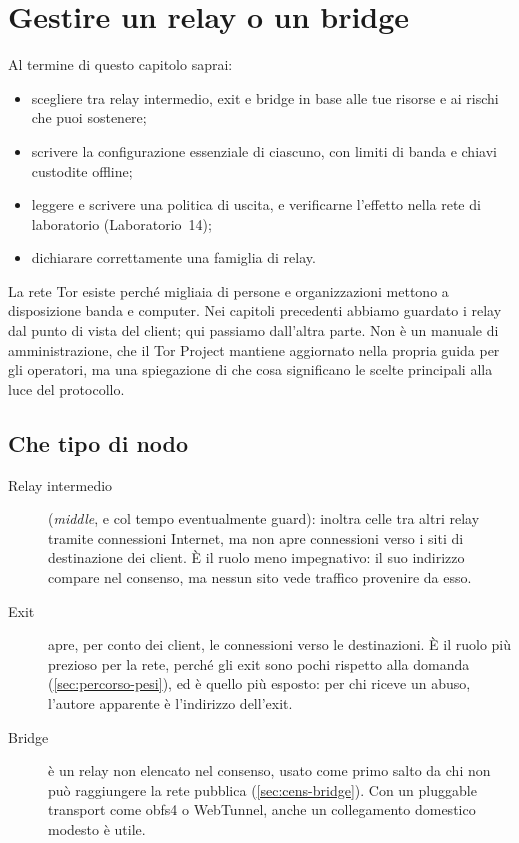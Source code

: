\chapter{Gestire un relay o un bridge}\label{cap:22-relay}

\begin{obiettivi}
Al termine di questo capitolo saprai:
\begin{itemize}[nosep]
  \item scegliere tra relay intermedio, exit e bridge in base alle tue risorse e ai rischi che puoi sostenere;
  \item scrivere la configurazione essenziale di ciascuno, con limiti di banda e chiavi custodite offline;
  \item leggere e scrivere una politica di uscita, e verificarne l'effetto nella rete di laboratorio (Laboratorio~14);
  \item dichiarare correttamente una famiglia di relay.
\end{itemize}
\end{obiettivi}

La rete Tor esiste perché migliaia di persone e organizzazioni mettono a disposizione banda e computer. Nei capitoli precedenti abbiamo guardato i relay dal punto di vista del client; qui passiamo dall'altra parte. Non è un manuale di amministrazione, che il Tor Project mantiene aggiornato nella propria guida per gli operatori, ma una spiegazione di che cosa significano le scelte principali alla luce del protocollo.

\section{Che tipo di nodo}\label{sec:relay-tipi}

\begin{description}
  \item[Relay intermedio] (\emph{middle}, e col tempo eventualmente guard): inoltra celle tra altri relay tramite connessioni Internet, ma non apre connessioni verso i siti di destinazione dei client. È il ruolo meno impegnativo: il suo indirizzo compare nel consenso, ma nessun sito vede traffico provenire da esso.
  \item[Exit] apre, per conto dei client, le connessioni verso le destinazioni. È il ruolo più prezioso per la rete, perché gli exit sono pochi rispetto alla domanda (\cref{sec:percorso-pesi}), ed è quello più esposto: per chi riceve un abuso, l'autore apparente è l'indirizzo dell'exit.
  \item[Bridge] è un relay non elencato nel consenso, usato come primo salto da chi non può raggiungere la rete pubblica (\cref{sec:cens-bridge}). Con un pluggable transport come obfs4 o WebTunnel, anche un collegamento domestico modesto è utile.
\end{description}

